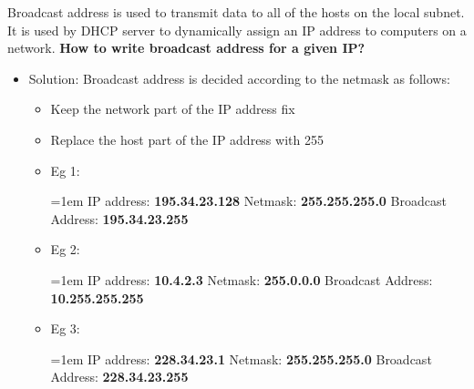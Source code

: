 \setlength{\columnsep}{3pt}
\begin{flushleft}
\bigskip
Broadcast address is used to transmit data to all of the hosts on the local subnet.
\newline
It is used by DHCP server to dynamically assign an IP address to computers on a network.
\newline
\newline
\textbf{How to write broadcast address for a given IP?}
\begin{itemize}
	\item Solution: Broadcast address is decided according to the netmask as follows:
	\begin{itemize}
		\item Keep the network part of the IP address fix
		\item Replace the host part of the IP address with 255
		\item Eg 1:
		\bigskip
		\begin{tcolorbox}[breakable,notitle,boxrule=-0pt,colback=pink,colframe=pink]
			\color{black}
			\font=1em
			IP address: \textbf{195.34.23.128}
			\newline
			Netmask: \textbf{255.255.255.0}
			\newline
			Broadcast Address: \textbf{195.34.23.255}
			\font=4pt
		\end{tcolorbox}
		\item Eg 2:
		\bigskip
		\begin{tcolorbox}[breakable,notitle,boxrule=-0pt,colback=pink,colframe=pink]
			\color{black}
			\font=1em
			IP address: \textbf{10.4.2.3}
			\newline
			Netmask: \textbf{255.0.0.0}
			\newline
			Broadcast Address: \textbf{10.255.255.255}
			\font=4pt
		\end{tcolorbox}
	\item Eg 3:
	\bigskip
	\begin{tcolorbox}[breakable,notitle,boxrule=-0pt,colback=pink,colframe=pink]
		\color{black}
		\font=1em
		IP address: \textbf{228.34.23.1}
		\newline
		Netmask: \textbf{255.255.255.0}
		\newline
		Broadcast Address: \textbf{228.34.23.255}
		\font=4pt
	\end{tcolorbox}
	\end{itemize}


\end{itemize}

\end{flushleft}
\newpage